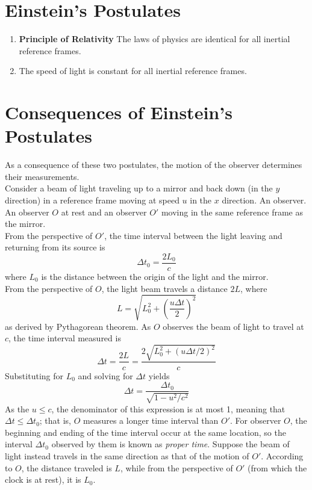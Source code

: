 \documentclass{subfiles}
\begin{document}
	\section{Einstein's Postulates}
		\begin{enumerate}
			\item \textbf{Principle of Relativity} 
				The laws of physics are identical for all inertial reference frames.
			\item 
				The speed of light is constant for all inertial reference frames.
		\end{enumerate}
	\section{Consequences of Einstein's Postulates}
		As a consequence of these two postulates, the motion of the observer determines their measurements. \\
			Consider a beam of light traveling up to a mirror and back down (in the \(y\) direction) in a reference frame moving at speed \(u\) in the \(x\) direction. An observer. An observer \(O\) at rest and an observer \(O'\) moving in the same reference frame as the mirror. \\
				From the perspective of \(O'\), the time interval between the light leaving and returning from its source is
				\[\Delta t_0 = \frac{2L_0}{c}\]
				where \(L_0\) is the distance between the origin of the light and the mirror. \\
				From the perspective of \(O\), the light beam travels a distance \(2L\), where
				\[L = \sqrt{L_0^2 + \left(\frac{u\Delta t}{2}\right)^2}\]
				as derived by Pythagorean theorem. As \(O\) observes the beam of light to travel at \(c\), the time interval measured is
				\[
					\Delta t = \frac{2L}{c} 
						= \frac{2\sqrt{L_0^2 + (u\Delta t/2)^2}}{c}
				\]
				Substituting for \(L_0\) and solving for \(\Delta t\) yields
				\[\Delta t = \frac{\Delta t_0}{\sqrt{1 - u^2/c^2}} \tag{time dilation}\]
				As the \(u \le c\), the denominator of this expression is at most 1, meaning that \(\Delta t \le \Delta t_0\); that is, \(O\) measures a longer time interval than \(O'\). For observer \(O\), the beginning and ending of the time interval occur at the same location, so the interval \(\Delta t_0\) observed by them is known as \textit{proper time}.
			Suppose the beam of light instead travels in the same direction as that of the motion of \(O'\). According to \(O\), the distance traveled is \(L\), while from the perspective of \(O'\) (from which the clock is at rest), it is \(L_0\). \\
\end{document}

